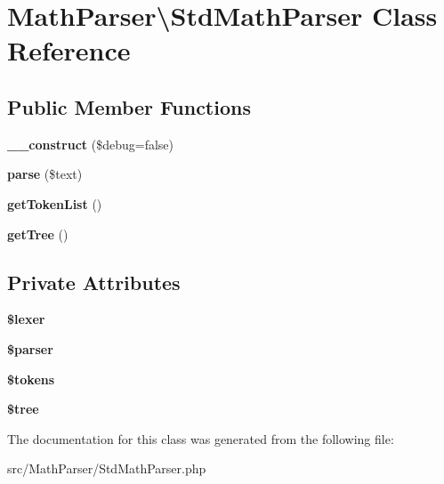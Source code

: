 \hypertarget{classMathParser_1_1StdMathParser}{\section{Math\-Parser\textbackslash{}Std\-Math\-Parser Class Reference}
\label{classMathParser_1_1StdMathParser}
}
\subsection*{Public Member Functions}
\begin{DoxyCompactItemize}
\item 
\hypertarget{classMathParser_1_1StdMathParser_a582d6ace9e6ef10d6d3314d82496c5cc}{{\bfseries \-\_\-\-\_\-construct} (\$debug=false)}\label{classMathParser_1_1StdMathParser_a582d6ace9e6ef10d6d3314d82496c5cc}

\item 
\hypertarget{classMathParser_1_1StdMathParser_a8eb08ff6c902fc7c1d01cf5ec14c67a5}{{\bfseries parse} (\$text)}\label{classMathParser_1_1StdMathParser_a8eb08ff6c902fc7c1d01cf5ec14c67a5}

\item 
\hypertarget{classMathParser_1_1StdMathParser_a656006e54a870b98dfa9352e7cc02ebe}{{\bfseries get\-Token\-List} ()}\label{classMathParser_1_1StdMathParser_a656006e54a870b98dfa9352e7cc02ebe}

\item 
\hypertarget{classMathParser_1_1StdMathParser_a9c824c8b42c4ed45b4b6b212eb06b617}{{\bfseries get\-Tree} ()}\label{classMathParser_1_1StdMathParser_a9c824c8b42c4ed45b4b6b212eb06b617}

\end{DoxyCompactItemize}
\subsection*{Private Attributes}
\begin{DoxyCompactItemize}
\item 
\hypertarget{classMathParser_1_1StdMathParser_ab6946ba25d66a75b424eae04d5cb070d}{{\bfseries \$lexer}}\label{classMathParser_1_1StdMathParser_ab6946ba25d66a75b424eae04d5cb070d}

\item 
\hypertarget{classMathParser_1_1StdMathParser_abd2f22d467ff3c59cf47907209baa6cd}{{\bfseries \$parser}}\label{classMathParser_1_1StdMathParser_abd2f22d467ff3c59cf47907209baa6cd}

\item 
\hypertarget{classMathParser_1_1StdMathParser_a7df1405869c2a0fdc4cbe8a47fe24b79}{{\bfseries \$tokens}}\label{classMathParser_1_1StdMathParser_a7df1405869c2a0fdc4cbe8a47fe24b79}

\item 
\hypertarget{classMathParser_1_1StdMathParser_a520e08ff2d81d78f211e11ed7d9b8a23}{{\bfseries \$tree}}\label{classMathParser_1_1StdMathParser_a520e08ff2d81d78f211e11ed7d9b8a23}

\end{DoxyCompactItemize}


The documentation for this class was generated from the following file\-:\begin{DoxyCompactItemize}
\item 
src/\-Math\-Parser/Std\-Math\-Parser.\-php\end{DoxyCompactItemize}
